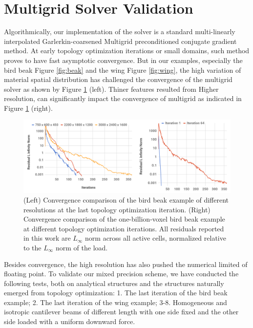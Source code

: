 \section{Multigrid Solver Validation}\label{sec:topopt_result}

Algorithmically, our implementation of the solver is a standard multi-linearly interpolated Garlerkin-coarsened Multigrid preconditioned conjugate gradient method. At early topology optimization iterations or small domains, such method proves to have fast asymptotic convergence. But in our examples, especially the bird beak Figure \ref{fig:beak} and the wing Figure \ref{fig:wing}, the high variation of material spatial distribution has challenged the convergence of the multigrid solver as shown by Figure \ref{fig:convergence_bird} (left). Thiner features resulted from Higher resolution, can significantly impact the convergence of multigrid as indicated in Figure \ref{fig:convergence_bird} (right).
\begin{figure}[t]
\includegraphics[width=1\linewidth]{images/TopOpt/Convergence_test}	
\caption{(Left) Convergence comparison of the bird beak example of different resolutions at the last topology optimization iteration.  (Right) Convergence comparison of the one-billion-voxel bird beak example at different topology optimization iterations. All residuals reported in this work are $L_{\infty}$ norm across all active cells, normalized relative to the $L_{\infty}$ norm of the load.}
\label{fig:convergence_bird}
\end{figure}

Besides convergence, the high resolution has also pushed the numerical limited of floating point. To validate our mixed precision scheme, we have conducted the following tests, both on analytical structures and the structures naturally emerged from topology optimization: 1. The last iteration of the bird beak example; 2. The last iteration of the wing example; 3-8. Homogeneous and isotropic cantilever beams of different length with one side fixed and the other side loaded with a uniform downward force. 


